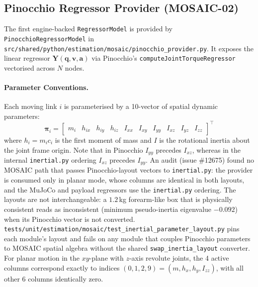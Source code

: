 \documentclass[11pt,a4paper]{article}
\newcommand{\bq}{\mathbf{q}}
\newcommand{\bv}{\mathbf{v}}
\newcommand{\ba}{\mathbf{a}}
\newcommand{\bY}{\mathbf{Y}}
\newcommand{\bpi}{\boldsymbol{\pi}}
\begin{document}
\subsection{Pinocchio Regressor Provider (MOSAIC-02)}
\label{subsec:pinocchio_regressor}
The first engine-backed \texttt{RegressorModel} is provided by \texttt{PinocchioRegressorModel}
in \texttt{src/shared/python/estimation/mosaic/pinocchio\_provider.py}.  It exposes the
linear regressor $\bY(\bq, \bv, \ba)$ via Pinocchio's \texttt{computeJointTorqueRegressor}
vectorised across $N$ nodes.

\paragraph{Parameter Conventions.} Each moving link $i$ is parameterised by a 10-vector
of spatial dynamic parameters:
\begin{equation}
  \bpi_i = \begin{bmatrix} m_i & h_{ix} & h_{iy} & h_{iz} & I_{xx} & I_{xy} & I_{yy} & I_{xz} & I_{yz} & I_{zz} \end{bmatrix}^\top
\end{equation}
where $h_i = m_i c_i$ is the first moment of mass and $I$ is the rotational inertia
about the joint frame origin.  Note that in Pinocchio $I_{yy}$ precedes $I_{xz}$,
whereas in the internal \texttt{inertial.py} ordering $I_{xz}$ precedes $I_{yy}$.
An audit (issue \#12675) found no MOSAIC path that passes Pinocchio-layout vectors
to \texttt{inertial.py}: the provider is consumed only in planar mode, whose columns
are identical in both layouts, and the MuJoCo and payload regressors use the
\texttt{inertial.py} ordering.  The layouts are not interchangeable: a $1.2$\,kg
forearm-like box that is physically consistent reads as inconsistent (minimum
pseudo-inertia eigenvalue $-0.092$) when its Pinocchio vector is not converted.
\texttt{tests/unit/estimation/mosaic/test\_inertial\_parameter\_layout.py} pins each
module's layout and fails on any module that couples Pinocchio parameters to MOSAIC
spatial algebra without the shared \texttt{swap\_inertia\_layout} converter.
For planar motion in the $xy$-plane with $z$-axis revolute joints, the 4 active columns
correspond exactly to indices $(0, 1, 2, 9) = (m, h_x, h_y, I_{zz})$, with all other 6
columns identically zero.
\end{document}
